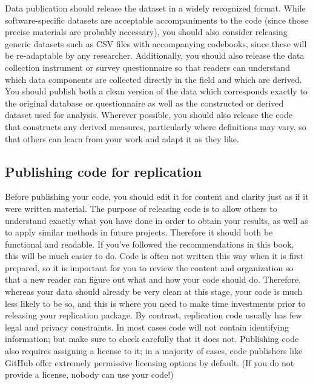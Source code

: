Data publication should release the dataset in a widely recognized format.
While software-specific datasets are acceptable accompaniments to the code
(since those precise materials are probably necessary),
you should also consider releasing generic datasets
such as CSV files with accompanying codebooks,
since these will be re-adaptable by any researcher.
Additionally, you should also release
the data collection instrument or survey questionnaire
so that readers can understand which data components are
collected directly in the field and which are derived.
You should publish both a clean version of the data
which corresponds exactly to the original database or questionnaire
as well as the constructed or derived dataset used for analysis.
Wherever possible, you should also release the code
that constructs any derived measures,
particularly where definitions may vary,
so that others can learn from your work and adapt it as they like.

\subsection{Publishing code for replication}

Before publishing your code, you should edit it for content and clarity
just as if it were written material.
The purpose of releasing code is to allow others to understand
exactly what you have done in order to obtain your results,
as well as to apply similar methods in future projects.
Therefore it should both be functional and readable.
If you've followed the recommendations in this book,
this will be much easier to do.
Code is often not written this way when it is first prepared,
so it is important for you to review the content and organization
so that a new reader can figure out what and how your code should do.
Therefore, whereas your data should already be very clean at this stage,
your code is much less likely to be so, and this is where you need to make
time investments prior to releasing your replication package.
By contrast, replication code usually has few legal and privacy constraints.
In most cases code will not contain identifying information;
but make sure to check carefully that it does not.
Publishing code also requires assigning a license to it;
in a majority of cases, code publishers like GitHub
offer extremely permissive licensing options by default.
(If you do not provide a license, nobody can use your code!)

